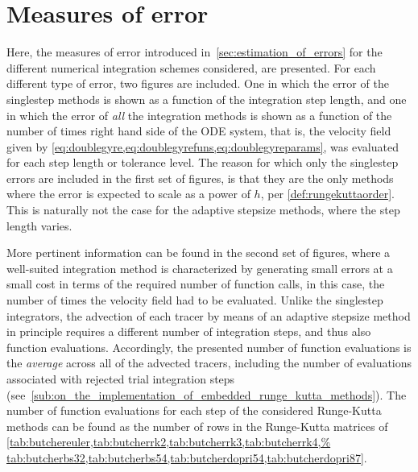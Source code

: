 \section{Measures of error}
\label{sec:measures_of_error}

Here, the measures of error introduced in~\cref{sec:estimation_of_errors} for
the different numerical integration schemes considered, are presented. For
each different type of error, two figures are included. One in which the error
of the singlestep methods is shown as a function of the integration step length,
and one in which the error of \emph{all} the integration methods is shown
as a function of the number of times right hand side of the ODE system, that is,
the velocity field given by
\cref{eq:doublegyre,eq:doublegyrefuns,eq:doublegyreparams}, was evaluated for
each step length or tolerance level. The reason for which only the singlestep
errors are included in the first set of figures, is that they are the only
methods where the error is expected to scale as a power of $h$, per
\cref{def:rungekuttaorder}. This is naturally not the case for the adaptive
stepsize methods, where the step length varies.

More pertinent information can be found in the second set of figures, where
a well-suited integration method is characterized by generating small
errors at a small cost in terms of the required number of function calls,
in this case, the number of times the velocity field had to be evaluated.
Unlike the singlestep integrators, the advection of each tracer by means
of an adaptive stepsize method in principle requires a different number of
integration steps, and thus also function evaluations. Accordingly, the
presented number of function evaluations is the \emph{average} across all of
the advected tracers, including the number of evaluations associated with
rejected trial integration steps
(see~\cref{sub:on_the_implementation_of_embedded_runge_kutta_methods}). The
number of function evaluations for each step of the considered Runge-Kutta
methods can be found as the number of rows in the Runge-Kutta matrices of
\cref{tab:butchereuler,tab:butcherrk2,tab:butcherrk3,tab:butcherrk4,%
tab:butcherbs32,tab:butcherbs54,tab:butcherdopri54,tab:butcherdopri87}.



